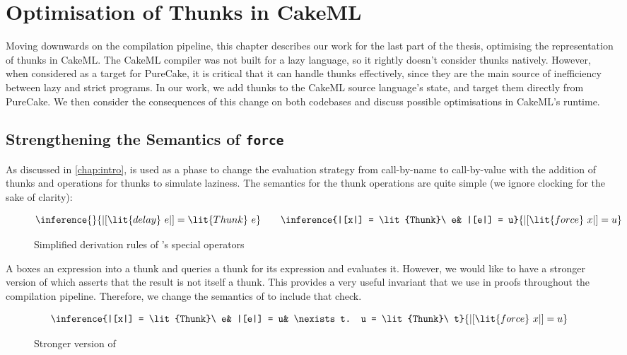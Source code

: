 \chapter{Optimisation of Thunks in CakeML}
\label{chap:thunks}

Moving downwards on the compilation pipeline, this chapter describes our work
for the last part of the thesis, optimising the representation of thunks in
CakeML. The CakeML compiler was not built for a lazy language, so it rightly
doesn't consider thunks natively. However, when considered as a target for
PureCake, it is critical that it can handle thunks effectively, since they are
the main source of inefficiency between lazy and strict programs. In our work,
we add thunks to the CakeML source language's state, and target them directly
from PureCake. We then consider the consequences of this change on both
codebases and discuss possible optimisations in CakeML's runtime.

\section{Strengthening the Semantics of \texttt{force}}

As discussed in \autoref{chap:intro}, \ThunkLang{} is used as a phase to change
the evaluation strategy from call-by-name to call-by-value with the addition of
thunks and operations for thunks to simulate laziness. The semantics for the
thunk operations are quite simple (we ignore clocking for the sake of clarity):

\begin{figure}[h]
  \[
    \inference{}{|[\lit{delay}\ e|] = \lit{Thunk}\ e} \qquad
    \inference
    {|[x|] = \lit{Thunk}\ e& |[e|] = u}
    {|[\lit{force}\ x|] = u}
  \]
  \caption{Simplified derivation rules of \ThunkLang{}'s special operators}
\end{figure}

A  boxes an expression into a thunk and  queries
a thunk for its expression and evaluates it. However, we would like to have a
stronger version of  which asserts that the result is not itself a
thunk. This provides a very useful invariant that we use in proofs throughout
the compilation pipeline. Therefore, we change the semantics of  to
include that check.

\begin{figure}[h]
  \[
    \inference
    {|[x|] = \lit{Thunk}\ e& |[e|] = u& \nexists t. u = \lit{Thunk}\ t}
    {|[\lit{force}\ x|] = u}
  \]
  \caption{Stronger version of }
\end{figure}

